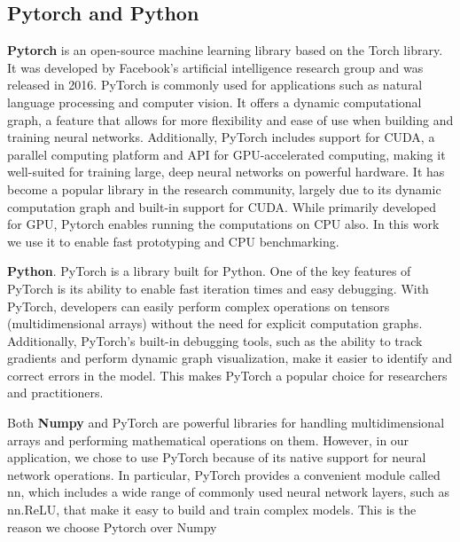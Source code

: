 \subsection{\Large Pytorch and Python}
    \textbf{Pytorch}\cite{Stevens} is an open-source machine learning library based on the Torch library. It was developed by Facebook's artificial intelligence research group and was released in 2016. PyTorch is commonly used for applications such as natural language processing and computer vision. It offers a dynamic computational graph, a feature that allows for more flexibility and ease of use when building and training neural networks. Additionally, PyTorch includes support for CUDA, a parallel computing platform and API for GPU-accelerated computing, making it well-suited for training large, deep neural networks on powerful hardware. It has become a popular library in the research community, largely due to its dynamic computation graph and built-in support for CUDA. While primarily developed for GPU, Pytorch enables running the computations on CPU also. In this work we use it to enable fast prototyping and CPU benchmarking.

    \textbf{Python}. PyTorch is a library built for Python. One of the key features of PyTorch is its ability to enable fast iteration times and easy debugging. With PyTorch, developers can easily perform complex operations on tensors (multidimensional arrays) without the need for explicit computation graphs. Additionally, PyTorch's built-in debugging tools, such as the ability to track gradients and perform dynamic graph visualization, make it easier to identify and correct errors in the model. This makes PyTorch a popular choice for researchers and practitioners.

     Both \textbf{Numpy} and PyTorch are powerful libraries for handling multidimensional arrays and performing mathematical operations on them. However, in our application, we chose to use PyTorch because of its native support for neural network operations. In particular, PyTorch provides a convenient module called nn, which includes a wide range of commonly used neural network layers, such as nn.ReLU, that make it easy to build and train complex models. This is the reason we choose Pytorch over Numpy